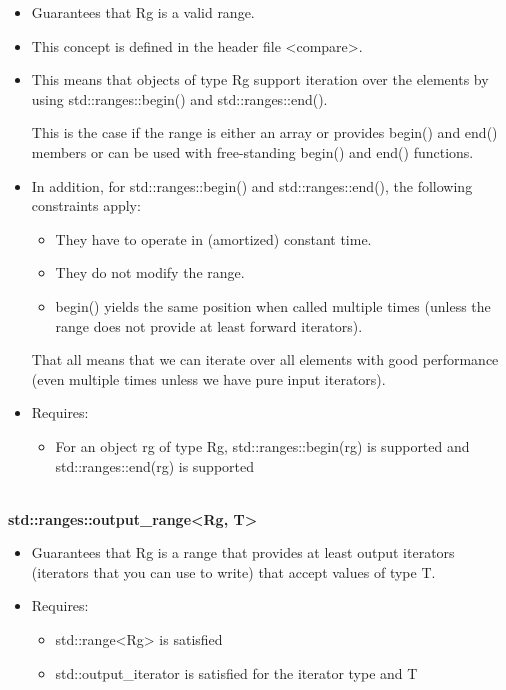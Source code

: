 \begin{itemize}
\item
Guarantees that Rg is a valid range.

\item
This concept is defined in the header file <compare>.

\item
This means that objects of type Rg support iteration over the elements by using std::ranges::begin() and std::ranges::end().

This is the case if the range is either an array or provides begin() and end() members or can be used with free-standing begin() and end() functions.

\item
In addition, for std::ranges::begin() and std::ranges::end(), the following constraints apply:

\begin{itemize}
\item
They have to operate in (amortized) constant time.

\item
They do not modify the range.

\item
begin() yields the same position when called multiple times (unless the range does not provide at least forward iterators).
\end{itemize}

That all means that we can iterate over all elements with good performance (even multiple times unless we have pure input iterators).

\item
Requires:

\begin{itemize}
\item
For an object rg of type Rg, std::ranges::begin(rg) is supported and std::ranges::end(rg) is supported
\end{itemize}
\end{itemize}

\noindent
\hspace*{\fill} \\ %
\textbf{std::ranges::output\_range<Rg, T>}

\begin{itemize}
\item
Guarantees that Rg is a range that provides at least output iterators (iterators that you can use to write) that accept values of type T.

\item
Requires:

\begin{itemize}
\item
std::range<Rg> is satisfied

\item
std::output\_iterator is satisfied for the iterator type and T
\end{itemize}
\end{itemize}


